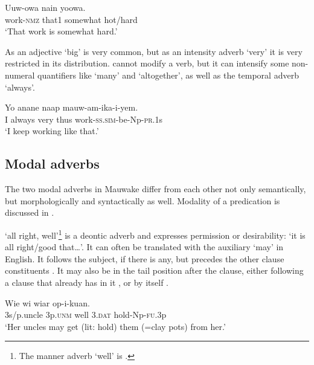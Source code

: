 \ea%
\label{ex:3:x703}
\gll Uuw-owa nain   yoowa. \\
work-\textsc{nmz} that1 somewhat hot/hard\\
\glt`That work is somewhat hard.'
\z

As an adjective  `big' is very common, but as an intensity adverb `very' it is very restricted in its distribution.  cannot modify a verb, but it can intensify some non-numeral quantifiers like  `many' and  `altogether', as well as the temporal adverb  `always'. 

\ea%
\label{ex:3:x509}
\gll Yo anane  naap mauw-am-ika-i-yem. \\
I always very thus work-\textsc{ss}.\textsc{sim}-be-Np-\textsc{pr}.1s\\
\glt`I  keep working like that.'
\z

\subsection{Modal adverbs}\label{sec:3.9.3}
{}
The two modal adverbs in Mauwake differ from each other not only semantically, but morphologically and syntactically as well. Modality of a predication is discussed in .

 `all right, well'\footnote{The manner adverb `well' is .} is a deontic adverb and expresses permission or desirability: `it is all right/good that{\dots}'. It can often be translated with the auxiliary `may' in English. It follows the subject, if there is any, but precedes the other clause constituents . It may also be in the tail position after the clause, either following a clause that already has  in it , or by itself . 

\ea%
\label{ex:3:x514}
\gll Wie wi  wiar op-i-kuan. \\
3s/p.uncle 3p.\textsc{unm} well 3.\textsc{dat} hold-Np-\textsc{fu}.3p\\
\glt`Her uncles may get (lit: hold) them (=clay pots) from her.' 
\z

